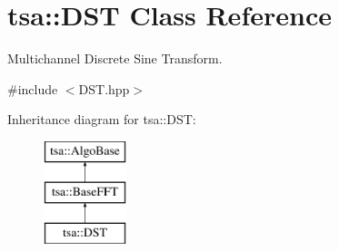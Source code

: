 \hypertarget{classtsa_1_1_d_s_t}{}\section{tsa\+:\+:D\+ST Class Reference}
\label{classtsa_1_1_d_s_t}


Multichannel Discrete Sine Transform.  




{\ttfamily \#include $<$D\+S\+T.\+hpp$>$}

Inheritance diagram for tsa\+:\+:D\+ST\+:\begin{figure}[H]
\begin{center}
\leavevmode
\includegraphics[height=3.000000cm]{classtsa_1_1_d_s_t}
\end{center}
\end{figure}
